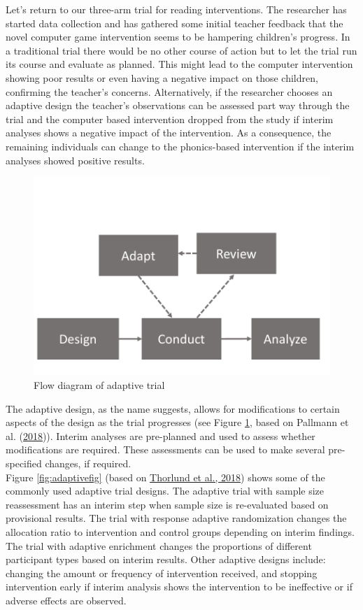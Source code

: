 \documentclass{krantz}
\begin{document}
Let's return to our three-arm trial for reading interventions. The researcher has started data collection and has gathered some initial teacher feedback that the novel computer game intervention seems to be hampering children's progress. In a traditional trial there would be no other course of action but to let the trial run its course and evaluate as planned. This might lead to the computer intervention showing poor results or even having a negative impact on those children, confirming the teacher's concerns. Alternatively, if the researcher chooses an adaptive design the teacher's observations can be assessed part way through the trial and the computer based intervention dropped from the study if interim analyses shows a negative impact of the intervention. As a consequence, the remaining individuals can change to the phonics-based intervention if the interim analyses showed positive results.

\begin{figure}

{\centering \includegraphics[width=0.5\linewidth]{images_bw/adaptive_flow} 

}

\caption{Flow diagram of adaptive trial}\label{fig:adaptiveflow}
\end{figure}

The adaptive design, as the name suggests, allows for modifications to certain aspects of the design as the trial progresses (see Figure \ref{fig:adaptiveflow}, based on Pallmann et al. (\protect\hyperlink{ref-pallmann2018}{2018})). Interim analyses are pre-planned and used to assess whether modifications are required. These assessments can be used to make several pre-specified changes, if required.\\
Figure \ref{fig:adaptivefig} (based on \protect\hyperlink{ref-thorlund2018}{Thorlund et al., 2018}) shows some of the commonly used adaptive trial designs. The adaptive trial with sample size reassessment has an interim step when sample size is re-evaluated based on provisional results. The trial with response adaptive randomization changes the allocation ratio to intervention and control groups depending on interim findings. The trial with adaptive enrichment changes the proportions of different participant types based on interim results. Other adaptive designs include: changing the amount or frequency of intervention received, and stopping intervention early if interim analysis shows the intervention to be ineffective or if adverse effects are observed.
\end{document}
